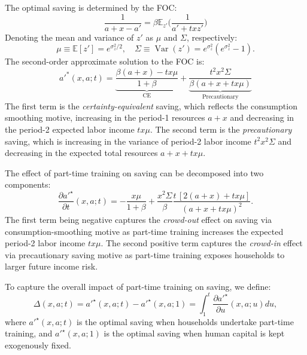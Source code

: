 \documentclass[12pt,english]{article}
\numberwithin{equation}{section}
\begin{document}
The optimal saving is determined by the FOC:
\begin{equation}
\frac{1}{a+x-a'} = \beta\mathbb{E}_{z'}\big(\frac{1}{a'+txz'}\big)
\end{equation}
Denoting the mean and variance of $z'$ as $\mu$ and $\Sigma$, respectively:
\begin{equation}
    \mu \equiv \mathbb{E}[z'] = e^{\sigma_z^2/2}, \quad \Sigma \equiv\operatorname{Var}(z') = e^{\sigma_z^2}(e^{\sigma_z^2}-1).
\end{equation}
The second-order approximate solution to the FOC is:
\begin{equation}
a'^*(x,a;t) = \underbrace{\frac{\beta(a+x) - tx\mu}{1+\beta}}_{\text{CE}} + \underbrace{\frac{t^2x^2\Sigma}{\beta(a+x + tx\mu)}}_{\text{Precautionary}}
\end{equation}
The first term is the \textit{certainty-equivalent} saving, which reflects the consumption smoothing motive, increasing in the period-1 resources $a+x$ and decreasing in the period-2 expected labor income $tx\mu$. The second term is the \textit{precautionary} saving, which is increasing in the variance of period-2 labor income $t^2x^2\Sigma$ and decreasing in the expected total resources $a+x+tx\mu$.

The effect of part-time training on saving can be decomposed into two components:
\begin{equation}
    \frac{\partial a'^\star}{\partial t}(x,a;t)
    = -\frac{x\mu}{1+\beta}+\frac{x^2 \Sigma}{\beta}\frac{t\,[2(a+x) + t x \mu]}{(a+x + t x \mu)^2}.
    \label{eq:dadt_partial}
\end{equation}
The first term being negative captures the \textit{crowd-out} effect on saving via consumption-smoothing motive as part-time training increases the expected period-2 labor income $tx\mu$. The second positive term captures the \textit{crowd-in} effect via precautionary saving motive as part-time training exposes households to larger future income risk.

To capture the overall impact of part-time training on saving, we define:
\begin{equation} \label{eq:dadt_integral}
    \Delta(x,a;t) = a'^\star(x,a;t) - a'^\star(x,a;1) = \int_1^t \frac{\partial a'^\star}{\partial u}(x,a;u) du,
\end{equation}
where $a'^\star(x,a;t)$ is the optimal saving when households undertake part-time training, and $a'^\star(x,a;1)$ is the optimal saving when human capital is kept exogenously fixed. 
\end{document}

